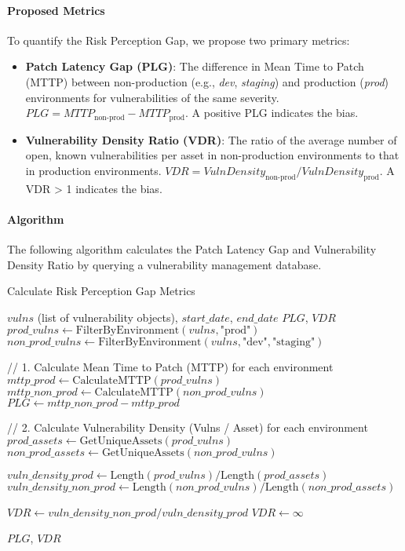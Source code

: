 \documentclass[11pt, a4paper]{article}
\begin{document}
\paragraph{Proposed Metrics}
To quantify the Risk Perception Gap, we propose two primary metrics:
\begin{itemize}
    \item \textbf{Patch Latency Gap (PLG)}: The difference in Mean Time to Patch (MTTP) between non-production (e.g., \textit{dev}, \textit{staging}) and production (\textit{prod}) environments for vulnerabilities of the same severity. \( PLG = MTTP_{\text{non-prod}} - MTTP_{\text{prod}} \). A positive PLG indicates the bias.
    \item \textbf{Vulnerability Density Ratio (VDR)}: The ratio of the average number of open, known vulnerabilities per asset in non-production environments to that in production environments. \( VDR = VulnDensity_{\text{non-prod}} / VulnDensity_{\text{prod}} \). A VDR > 1 indicates the bias.
\end{itemize}

\paragraph{Algorithm}
The following algorithm calculates the Patch Latency Gap and Vulnerability Density Ratio by querying a vulnerability management database.

\begin{algorithm}[H]
\caption{Calculate Risk Perception Gap Metrics}
\begin{algorithmic}[1]
\Require $vulns$ (list of vulnerability objects), $start\_date$, $end\_date$
\Ensure $PLG$, $VDR$
\State $prod\_vulns \gets \text{FilterByEnvironment}(vulns, \text{"prod"})$
\State $non\_prod\_vulns \gets \text{FilterByEnvironment}(vulns, \text{"dev"}, \text{"staging"})$

\State // 1. Calculate Mean Time to Patch (MTTP) for each environment
\State $mttp\_prod \gets \text{CalculateMTTP}(prod\_vulns)$
\State $mttp\_non\_prod \gets \text{CalculateMTTP}(non\_prod\_vulns)$
\State $PLG \gets mttp\_non\_prod - mttp\_prod$

\State // 2. Calculate Vulnerability Density (Vulns / Asset) for each environment
\State $prod\_assets \gets \text{GetUniqueAssets}(prod\_vulns)$
\State $non\_prod\_assets \gets \text{GetUniqueAssets}(non\_prod\_vulns)$

\State $vuln\_density\_prod \gets \text{Length}(prod\_vulns) / \text{Length}(prod\_assets)$
\State $vuln\_density\_non\_prod \gets \text{Length}(non\_prod\_vulns) / \text{Length}(non\_prod\_assets)$

    \State $VDR \gets vuln\_density\_non\_prod / vuln\_density\_prod$
\Else
    \State $VDR \gets \infty$ 
\EndIf

\State \Return $PLG$, $VDR$
\end{algorithmic}
\end{algorithm}
\end{document}
